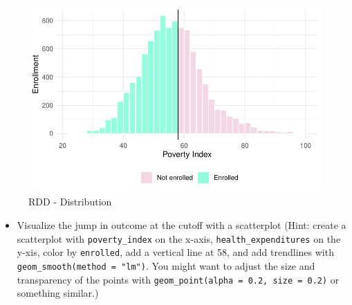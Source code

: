 \documentclass[
  letterpaper,
  DIV=11,
  numbers=noendperiod]{scrartcl}
\providecommand{\tightlist}{%
  \setlength{\itemsep}{0pt}\setlength{\parskip}{0pt}}\usepackage{longtable,booktabs,array}
\begin{document}
\begin{figure}[H]

\caption{\label{fig-rdd2}RDD - Distribution}

{\centering \includegraphics{Jamie-Esmond_problem-set-8_files/figure-pdf/fig-rdd2-1.pdf}

}

\end{figure}

\begin{itemize}
\tightlist
\item
  Visualize the jump in outcome at the cutoff with a scatterplot (Hint:
  create a scatterplot with \texttt{poverty\_index} on the x-axis,
  \texttt{health\_expenditures} on the y-xis, color by
  \texttt{enrolled}, add a vertical line at 58, and add trendlines with
  \texttt{geom\_smooth(method\ =\ "lm")}. You might want to adjust the
  size and transparency of the points with
  \texttt{geom\_point(alpha\ =\ 0.2,\ size\ =\ 0.2)} or something
  similar.)
\end{itemize}
\end{document}

